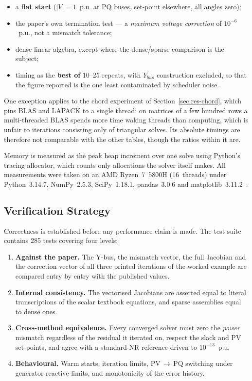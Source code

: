 \documentclass[sigconf,nonacm]{acmart}
\begin{document}
\begin{itemize}
\item a \textbf{flat start} ($|V| = 1$~p.u. at PQ buses, set-point elsewhere,
      all angles zero);
\item the paper's own termination test --- a \emph{maximum voltage correction}
      of $10^{-6}$~p.u., not a mismatch tolerance;
\item dense linear algebra, except where the dense/sparse comparison is the
      subject;
\item timing as the \textbf{best of} 10--25 repeats, with $Y_{bus}$
      construction excluded, so that the figure reported is the one least
      contaminated by scheduler noise.
\end{itemize}

\noindent One exception applies to the chord experiment of
Section~\ref{sec:res-chord}, which pins BLAS and LAPACK to a single thread:
on matrices of a few hundred rows a multi-threaded BLAS spends more time waking
threads than computing, which is unfair to iterations consisting only of
triangular solves. Its absolute timings are therefore not comparable with the
other tables, though the ratios within it are.

Memory is measured as the peak heap increment over one solve using
Python's tracing allocator, which counts only allocations the solver itself
makes. All measurements were taken on an AMD Ryzen~7~5800H (16~threads) under
Python~3.14.7, NumPy~2.5.3, SciPy~1.18.1, pandas~3.0.6 and
matplotlib~3.11.2~\cite{numpy,scipy,matplotlib,pandas}.

\subsection{Verification Strategy}
Correctness is established before any performance claim is made. The test suite
contains 285 tests covering four levels:

\begin{enumerate}
\item \textbf{Against the paper.} The Y-bus, the mismatch vector, the full
      Jacobian and the correction vector of all three printed iterations of the
      worked example are compared entry by entry with the published values.
\item \textbf{Internal consistency.} The vectorised Jacobians are asserted equal
      to literal transcriptions of the scalar textbook equations, and sparse
      assemblies equal to dense ones.
\item \textbf{Cross-method equivalence.} Every converged solver must zero the
      \emph{power} mismatch regardless of the residual it iterated on, respect
      the slack and PV set-points, and agree with a standard-NR reference driven
      to $10^{-13}$~p.u.
\item \textbf{Behavioural.} Warm starts, iteration limits, PV\,$\to$\,PQ
      switching under generator reactive limits, and monotonicity of the error
      history.
\end{enumerate}
\end{document}
